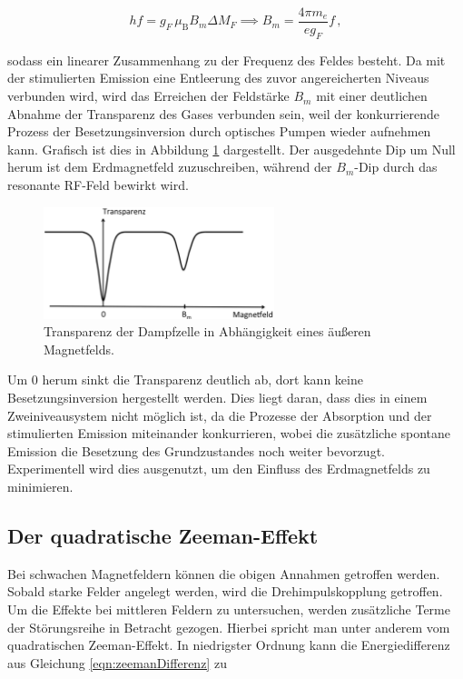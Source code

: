 \begin{equation}
  h f = g_F \, \mu_{\text{B}} B_m \Delta M_F \implies B_m = \frac{4 \pi m_e}{e g_F} f\,,
  \label{eqn:B_M_Theorie}
\end{equation}

sodass ein linearer Zusammenhang zu der Frequenz des Feldes besteht.
Da mit der stimulierten Emission eine Entleerung des zuvor angereicherten Niveaus verbunden wird, wird das Erreichen
der Feldstärke $B_m$ mit einer deutlichen Abnahme der Transparenz des Gases verbunden sein, weil der konkurrierende
Prozess der Besetzungsinversion durch optisches Pumpen wieder aufnehmen kann. Grafisch ist dies in Abbildung
\ref{fig:transparenz} dargestellt. Der ausgedehnte Dip um Null herum ist dem Erdmagnetfeld zuzuschreiben, während
der $B_m$-Dip durch das resonante RF-Feld bewirkt wird.

\begin{figure}
  \centering
  \includegraphics[width=0.6\textwidth]{images/transparenz.png}
  \caption{Transparenz der Dampfzelle in Abhängigkeit eines äußeren Magnetfelds.
          \cite{anleitung}}
  \label{fig:transparenz}
\end{figure}

Um 0 herum sinkt die Transparenz deutlich ab, dort kann keine Besetzungsinversion hergestellt werden. Dies liegt
daran, dass dies in einem Zweiniveausystem nicht möglich ist, da die Prozesse der Absorption und der
stimulierten Emission miteinander konkurrieren, wobei die zusätzliche spontane Emission die Besetzung des
Grundzustandes noch weiter bevorzugt. Experimentell wird dies ausgenutzt, um den Einfluss des Erdmagnetfelds zu minimieren.

\subsection{Der quadratische Zeeman-Effekt}
\label{subsec:quadratischerZeeman}

Bei schwachen Magnetfeldern können die obigen Annahmen getroffen werden.
Sobald starke Felder angelegt werden, wird die Drehimpulskopplung getroffen.
Um die Effekte bei mittleren Feldern zu untersuchen, werden zusätzliche
Terme der Störungsreihe in Betracht gezogen. Hierbei spricht man unter anderem vom
quadratischen Zeeman-Effekt. In niedrigster Ordnung kann die Energiedifferenz
aus Gleichung \eqref{eqn:zeemanDifferenz} zu

